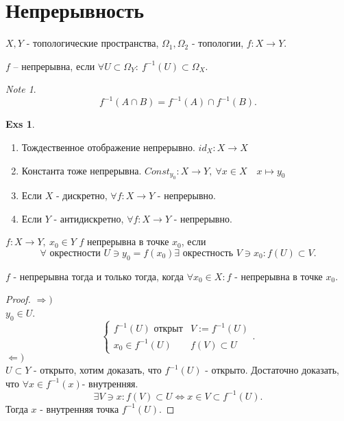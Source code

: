 \documentclass[11pt]{book}
\theoremstyle{definition}
\theoremstyle{plain}
\theoremstyle{plain}
\theoremstyle{definition}
\newtheorem*{exs}{Exs}
\theoremstyle{remark}
\newtheorem*{note}{Note}
\begin{document}
\section{Непрерывность}
$X, Y$ - топологические пространства, $\Omega_1, \Omega_2$ -  топологии, $f: X \to  Y$.
\begin{defn}
    $f$ -- непрерывна, если $\forall U \subset \Omega _Y: ~ f^{-1} (U)\subset \Omega_X$.
\end{defn}
\begin{note}
    \[
	f^{-1} (A \cap B) = f^{-1}(A) \cap f^{-1}(B)
    .\]
\end{note}
\begin{exs}
    $ $
    \begin{enumerate}
	\item Тождественное отображение непрерывно. $id_X : X \to  X$
	\item Константа тоже непрерывна. $Const_{y_0}:X \to Y, ~ \forall x \in  X \quad x\mapsto y_0 $
	\item Если $X$ - дискретно, $\forall f: X \to  Y$ - непрерывно.
	\item Если $Y$ - антидискретно, $\forall f: X \to  Y$ - непрерывно.
    \end{enumerate}
\end{exs}
\begin{defn}
    $f: X \to  Y, ~ x_0 \in Y$
    $f$ непрерывна в точке $ x_0$, если \[
	\forall \mbox{ окрестности } U \ni y_0 = f(x_0) \exists \mbox{ окрестность } V \ni x_0: f(U) \subset V
    .\]
\end{defn}
\begin{thm}
    $f$ - непрерывна тогда и только тогда, когда $\forall x_0 \in  X: f$ - непрерывна в точке $x_0$.
\end{thm}
\begin{proof}
    $\Rightarrow )$\\
    $y_0 \in  U$.
    \[
	\left \{
	    \begin{array}{ll}
		f^{-1}(U) \mbox{ открыт} & V:=f^{-1}(U)\\
		x_0 \in f^{-1}(U) & f(V) \subset U

	    \end{array}
	\right .
    .\]
    $\Leftarrow )$\\
    $U \subset Y$ - открыто, хотим доказать, что $f^{-1}(U)$ - открыто.
    Достаточно доказать, что $\forall x \in  f^{-1}(x) $- внутренняя.
    \[
	\exists V \ni x: f(V)\subset U \Leftrightarrow x \in  V \subset f^{-1}(U)
    .\]
    Тогда $x$ - внутренняя точка $f^{-1}(U)$.
\end{proof}
\end{document}
